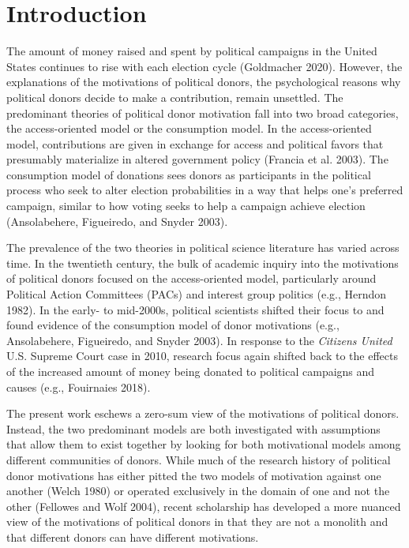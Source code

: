 \documentclass[12pt,]{article}
\begin{document}
\vskip -8.5pt



\noindent \doublespacing 

\newpage

\hypertarget{introduction}{%
\section{Introduction}\label{introduction}}

The amount of money raised and spent by political campaigns in the
United States continues to rise with each election cycle (Goldmacher
2020). However, the explanations of the motivations of political donors,
the psychological reasons why political donors decide to make a
contribution, remain unsettled. The predominant theories of political
donor motivation fall into two broad categories, the access-oriented
model or the consumption model. In the access-oriented model,
contributions are given in exchange for access and political favors that
presumably materialize in altered government policy (Francia et al.
2003). The consumption model of donations sees donors as participants in
the political process who seek to alter election probabilities in a way
that helps one's preferred campaign, similar to how voting seeks to help
a campaign achieve election (Ansolabehere, Figueiredo, and Snyder 2003).

The prevalence of the two theories in political science literature has
varied across time. In the twentieth century, the bulk of academic
inquiry into the motivations of political donors focused on the
access-oriented model, particularly around Political Action Committees
(PACs) and interest group politics (e.g., Herndon 1982). In the early-
to mid-2000s, political scientists shifted their focus to and found
evidence of the consumption model of donor motivations (e.g.,
Ansolabehere, Figueiredo, and Snyder 2003). In response to the
\emph{Citizens United} U.S. Supreme Court case in 2010, research focus
again shifted back to the effects of the increased amount of money being
donated to political campaigns and causes (e.g., Fouirnaies 2018).

The present work eschews a zero-sum view of the motivations of political
donors. Instead, the two predominant models are both investigated with
assumptions that allow them to exist together by looking for both
motivational models among different communities of donors. While much of
the research history of political donor motivations has either pitted
the two models of motivation against one another (Welch 1980) or
operated exclusively in the domain of one and not the other (Fellowes
and Wolf 2004), recent scholarship has developed a more nuanced view of
the motivations of political donors in that they are not a monolith and
that different donors can have different motivations.
\end{document}
